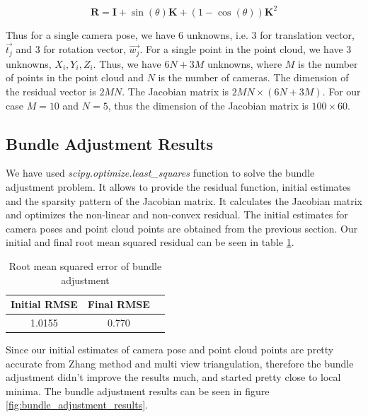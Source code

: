 \documentclass{article}
\begin{document}

\begin{equation}
    \mathbf{R} = \mathbf{I} + \sin(\theta) \mathbf{K} + (1 - \cos(\theta)) \mathbf{K}^2
\end{equation}

Thus for a single camera pose, we have 6 unknowns, i.e. 3 for translation vector, $\vec{t_j}$ and 3 for rotation vector, $\vec{w_j}$. For a single point in the point cloud, 
we have 3 unknowns, $X_i, Y_i, Z_i$. Thus, we have $6N + 3M$ unknowns, where $M$ is the number of points in the point cloud and $N$ is the number of cameras. 
The dimension of the residual vector is $2MN$. The Jacobian matrix is $2MN \times (6N + 3M)$. For our case $M = 10$ and $N = 5$, thus the dimension of the Jacobian matrix is $100 \times 60$.


\subsection{Bundle Adjustment Results}
We have used \textit{scipy.optimize.least\_squares} function to solve the bundle adjustment problem. It allows to provide the residual function, initial estimates and the sparsity pattern of the Jacobian matrix.
It calculates the Jacobian matrix and optimizes the non-linear and non-convex residual. The initial estimates for camera poses and point cloud points are obtained from the previous section.
Our initial and final root mean squared residual can be seen in table \ref{tab:bundle_adjustment_rmse}.

\begin{table}[h]
    \centering
    \begin{tabular}{|c|c|c|}
        \hline
        Initial RMSE & Final RMSE \\
        \hline
        1.0155 & 0.770 \\
        \hline
    \end{tabular}
    \caption{Root mean squared error of bundle adjustment}
    \label{tab:bundle_adjustment_rmse}
\end{table}

Since our initial estimates of camera pose and point cloud points are pretty accurate from Zhang method and multi view triangulation, therefore the bundle adjustment didn't improve the results much, and started 
pretty close to local minima. The bundle adjustment results can be seen in figure \ref{fig:bundle_adjustment_results}.

\pagebreak
\end{document}
